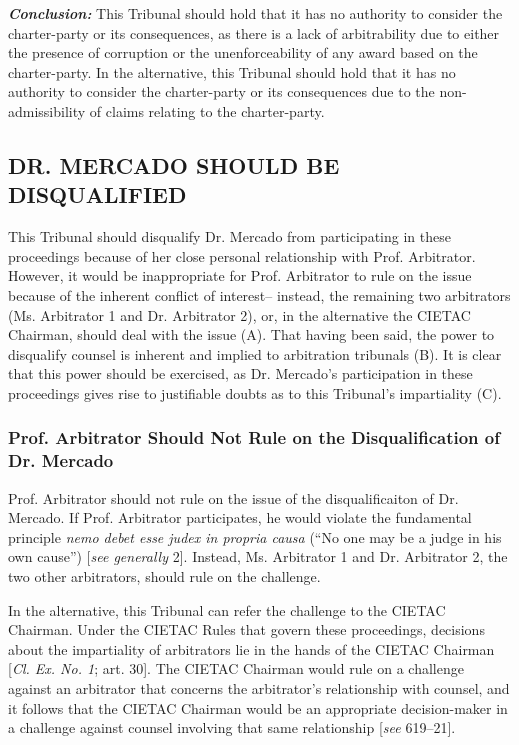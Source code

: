 \textit{\textbf{Conclusion:}} This Tribunal should hold that it has no authority to consider the charter-party or its consequences, as there is a lack of arbitrability due to either the presence of corruption or the unenforceability of any award based on the charter-party. In the alternative, this Tribunal should hold that it has no authority to consider the charter-party or its consequences due to the non-admissibility of claims relating to the charter-party. 

\subsection{DR. MERCADO SHOULD BE DISQUALIFIED}

This Tribunal should disqualify Dr. Mercado from participating in these proceedings because of her close personal relationship with Prof. Arbitrator. However, it would be inappropriate for Prof. Arbitrator to rule on the issue because of the inherent conflict of interest-- instead, the remaining two arbitrators (Ms. Arbitrator 1 and Dr. Arbitrator 2), or, in the alternative the CIETAC Chairman, should deal with the issue (A). That having been said, the power to disqualify counsel is inherent and implied to arbitration tribunals (B). It is clear that this power should be exercised, as Dr. Mercado's participation in these proceedings gives rise to justifiable doubts as to this Tribunal's impartiality (C).

\subsubsection{Prof. Arbitrator Should Not Rule on the Disqualification of Dr. Mercado}

Prof. Arbitrator should not rule on the issue of the disqualificaiton of Dr. Mercado. If Prof. Arbitrator participates, he would violate the fundamental principle \emph{nemo debet esse judex in propria causa} (``No one may be a judge in his own cause'') [\textit{see generally} \cite{Luttrell} 2]. Instead, Ms. Arbitrator 1 and Dr. Arbitrator 2, the two other arbitrators, should rule on the challenge.

In the alternative, this Tribunal can refer the challenge to the CIETAC Chairman. Under the CIETAC Rules that govern these proceedings, decisions about the impartiality of arbitrators lie in the hands of the CIETAC Chairman [\textit{Cl. Ex. No. 1}; \cite{CIETAC Rules} {art. 30}]. The CIETAC Chairman would rule on a challenge against an arbitrator that concerns the arbitrator's relationship with counsel, and it follows that the CIETAC Chairman would be an appropriate decision-maker in a challenge against counsel involving that same relationship [\textit{see} \cite{Waincymer} {619--21}].

